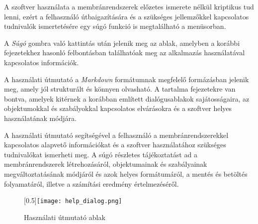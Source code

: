 A szoftver használata a membránrendszerek előzetes ismerete nélkül kriptikus tud lenni, ezért a felhasználó útbaigazítására és a szükséges jellemzőkkel kapcsolatos tudnivalók ismertetésére egy súgó funkció is megtalálható a menüsorban.

A \textit{Súgó} gombra való kattintás után jelenik meg az ablak, amelyben a korábbi fejezetekhez hasonló felbontásban találhatóak meg az alkalmazás használatával kapcsolatos információk.

A használati útmutató a \textit{Markdown} formátumnak megfelelő formázásban jelenik meg, amely jól strukturált és könnyen olvasható. A tartalma fejezetekre van bontva, amelyek kitérnek a korábban említett dialógusablakok sajátosságaira, az objektumokkal és szabályokkal kapcsolatos elvárásokra és a szoftver helyes használatának módjára.



A használati útmutató segítségével a felhasználó a membránrendszerekkel kapcsolatos alapvető információkat és a szoftver használatához szükséges tudnivalókat ismerheti meg. A súgó részletes tájékoztatást ad a membránrendszerek létrehozásáról, objektumainak és szabályainak megváltoztatásának módjáról és azok helyes formátumáról, a mentés és betöltés folyamatáról, illetve a számítási eredmény értelmezéséről.

\begin{figure}[H]
	\centering
	\scalebox{0.5}[0.5]{\texttt{[image: help\_dialog.png]}}
	\caption{Használati útmutató ablak}
	\label{fig:help_dialog}
\end{figure}